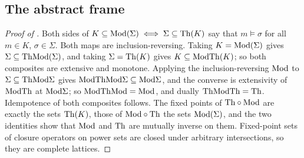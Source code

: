 \subsection{The abstract frame}\label{app:existence:galois}

\begin{proof}[Proof of ]
Both sides of $K\subseteq\mathrm{Mod}(\Sigma)\iff\Sigma\subseteq\mathrm{Th}(K)$ say that $m\models\sigma$ for all $m\in K$, $\sigma\in\Sigma$. Both maps are inclusion-reversing. Taking $K=\mathrm{Mod}(\Sigma)$ gives $\Sigma\subseteq\mathrm{Th}\mathrm{Mod}(\Sigma)$, and taking $\Sigma=\mathrm{Th}(K)$ gives $K\subseteq\mathrm{Mod}\mathrm{Th}(K)$; so both composites are extensive and monotone. Applying the inclusion-reversing $\mathrm{Mod}$ to $\Sigma\subseteq\mathrm{Th}\mathrm{Mod}\Sigma$ gives $\mathrm{Mod}\mathrm{Th}\mathrm{Mod}\Sigma\subseteq\mathrm{Mod}\Sigma$, and the converse is extensivity of $\mathrm{Mod}\mathrm{Th}$ at $\mathrm{Mod}\Sigma$; so $\mathrm{Mod}\mathrm{Th}\mathrm{Mod}=\mathrm{Mod}$, and dually $\mathrm{Th}\mathrm{Mod}\mathrm{Th}=\mathrm{Th}$. Idempotence of both composites follows. The fixed points of $\mathrm{Th}\circ\mathrm{Mod}$ are exactly the sets $\mathrm{Th}(K)$, those of $\mathrm{Mod}\circ\mathrm{Th}$ the sets $\mathrm{Mod}(\Sigma)$, and the two identities show that $\mathrm{Mod}$ and $\mathrm{Th}$ are mutually inverse on them. Fixed-point sets of closure operators on power sets are closed under arbitrary intersections, so they are complete lattices.
\end{proof}

